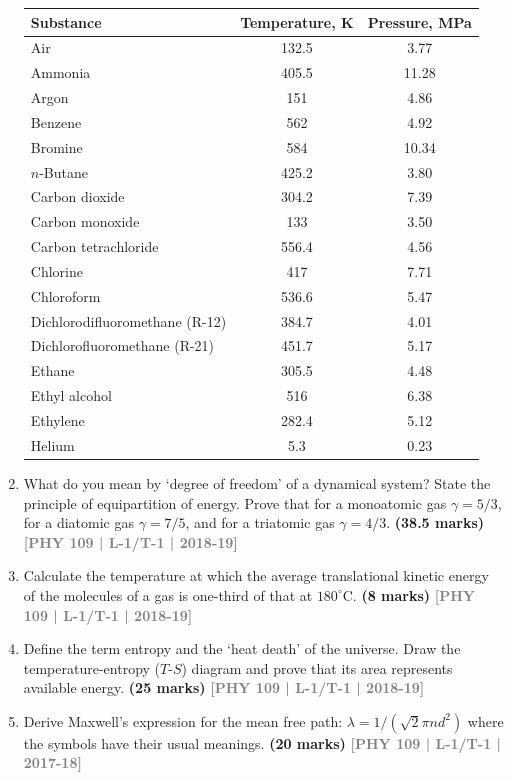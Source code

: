 \documentclass[12pt,a3paper]{article}
\newcommand{\yr}[1]{\hfill\textcolor{gray}{\small\textbf{[#1]}}}
\newcommand{\mk}[1]{\textcolor{orange!70!black}{\small\textbf{(#1 marks)}}}
\begin{document}
\begin{enumerate}
\begin{tabular}{lcc}
\toprule
\textbf{Substance} & \textbf{Temperature, K} & \textbf{Pressure, MPa} \\ 
\midrule
Air & 132.5 & 3.77 \\
Ammonia & 405.5 & 11.28 \\
Argon & 151 & 4.86 \\
Benzene & 562 & 4.92 \\
Bromine & 584 & 10.34 \\
$n$-Butane & 425.2 & 3.80 \\
Carbon dioxide & 304.2 & 7.39 \\
Carbon monoxide & 133 & 3.50 \\
Carbon tetrachloride & 556.4 & 4.56 \\
Chlorine & 417 & 7.71 \\
Chloroform & 536.6 & 5.47 \\
Dichlorodifluoromethane (R-12) & 384.7 & 4.01 \\
Dichlorofluoromethane (R-21) & 451.7 & 5.17 \\
Ethane & 305.5 & 4.48 \\
Ethyl alcohol & 516 & 6.38 \\
Ethylene & 282.4 & 5.12 \\
Helium & 5.3 & 0.23 \\
\bottomrule
\end{tabular}


\item What do you mean by `degree of freedom' of a dynamical system? State the principle of equipartition of energy. Prove that for a monoatomic gas $\gamma = 5/3$, for a diatomic gas $\gamma = 7/5$, and for a triatomic gas $\gamma = 4/3$.
\mk{38.5} \yr{PHY 109 | L-1/T-1 | 2018-19}

\item Calculate the temperature at which the average translational kinetic energy of the molecules of a gas is one-third of that at $180^\circ$C.
\mk{8} \yr{PHY 109 | L-1/T-1 | 2018-19}

\item Define the term entropy and the `heat death' of the universe. Draw the temperature-entropy ($T$-$S$) diagram and prove that its area represents available energy.
\mk{25} \yr{PHY 109 | L-1/T-1 | 2018-19}

\item Derive Maxwell's expression for the mean free path: $\lambda = 1/(\sqrt{2}\pi n d^2)$ where the symbols have their usual meanings.
\mk{20} \yr{PHY 109 | L-1/T-1 | 2017-18}


\end{enumerate}
\end{document}
